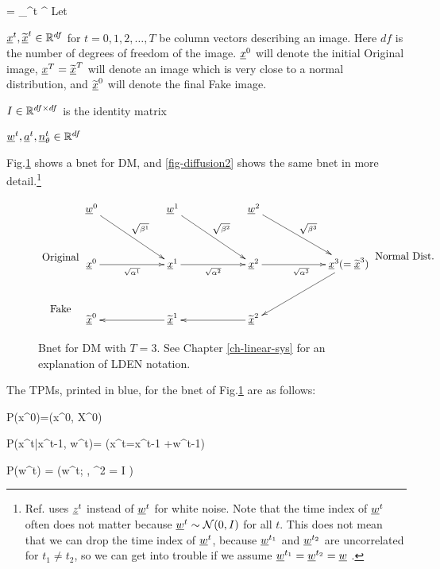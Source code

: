 \beq
\prodalp= \prod_{}^t \alp^\tau
\eeq
Let 

${\underline{x}}^t, {\widetilde{{\underline{x}}}}^t\in { \mathbb{R}}^{df}$ for $t=0, 1, 2,
\ldots, T$ be column vectors
describing an image. Here $df$
is the number of degrees of freedom 
of the image. ${\underline{x}}^0$ 
will denote the initial Original image,
${\underline{x}}^T={\widetilde{{\underline{x}}}}^T$
will denote an image which 
is very close to a 
normal distribution,
and ${\widetilde{{\underline{x}}}}^0$
will denote the final Fake image.

$I\in { \mathbb{R}}^{df\times df}$ is the 
identity matrix

${\underline{w}}^t, {\underline{a}}^t,
{\underline{n}}^t_\theta \in{ \mathbb{R}}^{df}$



Fig.\ref{fig-diffusion1} shows a
bnet for DM, and  
\ref{fig-diffusion2}
shows the same bnet 
in more detail.\footnote{
Ref.\cite{weng-diffusion-model} uses ${\underline{z}}^{t}$ 
instead of ${\underline{w}}^{t}$
for white noise.
Note that 
the time index
of 
${\underline{w}}^{t}$
often does not matter
because 
${\underline{w}}^{t}\sim {\cal N}(0, I)$
for all $t$.
This does not mean
that we can drop the
time index of ${\underline{w}}^t$,
because ${\underline{w}}^{t_1}$
and ${\underline{w}}^{t_2}$
are uncorrelated for $t_1\neq t_2$,
so we can get into 
trouble if we assume
${\underline{w}}^{t_1}={\underline{w}}^{t_2}={\underline{w}}$ .
}

\begin{figure}[h!]
$$
\xymatrix@C=5pc@R=3pc{
\\
\text{Original}
\\
\text{Fake}
}
\xymatrix@C=5pc@R=3pc{
\rvw^0\ar[dr]^{\sqrt{\beta^1}}
&\rvw^1\ar[dr]^{\sqrt{\beta^2}}
&\rvw^2\ar[dr]^{\sqrt{\beta^3}}
\\
\rvx^0\ar[r]_{\sqrt{\alp^1}}
&\rvx^1\ar[r]_{\sqrt{\alp^2}}
&\rvx^2\ar[r]_{\sqrt{\alp^3}}
&\rvx^3(= \TIL{\rvx}^3)\ar[dl]
\\
\TIL{\rvx}^0
&\TIL{\rvx}^1\ar[l]
&\TIL{\rvx}^2\ar[l]
&
}
\xymatrix@C=5pc@R=3pc{
\\
\text{Normal Dist.}
}
$$
\caption{Bnet for DM with $T=3$.
See Chapter \ref{ch-linear-sys}
 for an explanation of LDEN notation.}
\label{fig-diffusion1}
\end{figure}


The TPMs, printed in blue,
for the bnet of Fig.\ref{fig-diffusion1}
are as follows:

\beq \color{blue}
P(x^0)=\delta(x^0, X^0)
\quad {}
\eeq

\beq \color{blue}
P(x^t|x^{t-1}, w^{t})=
\indi(\quad x^t=\;x^{t-1}
+\;w^{t-1}\quad)
\eeq

\beq \color{blue}
P(w^t) = \caln(w^t; ,
 \s^2 =  I ) \quad {}
\eeq

